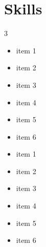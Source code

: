\documentclass{article}
\begin{document}
\section*{Skills}
\begin{multicols}{3}
    \begin{itemize}[leftmargin=*]
        \item item 1
        \item item 2
        \item item 3
        \item item 4
        \item item 5
        \item item 6
        \item item 1
        \item item 2
        \item item 3
        \item item 4
        \item item 5
        \item item 6
    \end{itemize}
\end{multicols}
\end{document}
